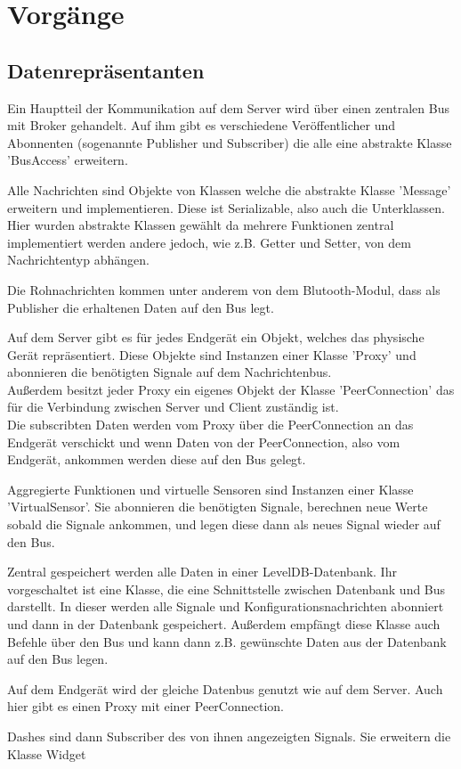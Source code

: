 \documentclass[entwurf.tex]{subfiles}
\begin{document}
\chapter{Vorgänge}
\section{Datenrepräsentanten}
Ein Hauptteil der Kommunikation auf dem Server wird über einen zentralen Bus mit Broker gehandelt. Auf ihm gibt es verschiedene Veröffentlicher und Abonnenten (sogenannte Publisher und Subscriber) die alle  eine abstrakte Klasse 'BusAccess' erweitern.

Alle Nachrichten sind Objekte von Klassen welche die abstrakte Klasse 'Message' erweitern und implementieren. Diese ist Serializable, also auch die Unterklassen. Hier wurden abstrakte Klassen gewählt da mehrere Funktionen zentral implementiert werden andere jedoch, wie z.B. Getter und Setter, von dem Nachrichtentyp abhängen.  

Die Rohnachrichten kommen unter anderem von dem Blutooth-Modul, dass als Publisher die erhaltenen Daten auf den Bus legt.

Auf dem Server gibt es für jedes Endgerät ein Objekt, welches das physische Gerät repräsentiert. Diese Objekte sind Instanzen einer Klasse 'Proxy' und abonnieren die benötigten Signale auf dem Nachrichtenbus. \\
Außerdem besitzt jeder Proxy ein eigenes Objekt der Klasse 'PeerConnection' das für die Verbindung zwischen Server und Client zuständig ist. \\
Die subscribten Daten werden vom Proxy über die PeerConnection an das Endgerät verschickt und wenn Daten von der PeerConnection, also vom Endgerät, ankommen werden diese auf den Bus gelegt.

Aggregierte Funktionen und virtuelle Sensoren sind Instanzen einer Klasse 'VirtualSensor'. Sie abonnieren die benötigten Signale, berechnen neue Werte sobald die Signale ankommen, und legen diese dann als neues Signal wieder auf den Bus. 

Zentral gespeichert werden alle Daten in einer LevelDB-Datenbank. Ihr vorgeschaltet ist eine Klasse, die eine Schnittstelle zwischen Datenbank und Bus darstellt. In dieser werden alle Signale und Konfigurationsnachrichten abonniert und dann in der Datenbank gespeichert. Außerdem empfängt diese Klasse auch Befehle über den Bus und kann dann z.B. gewünschte Daten aus der Datenbank auf den Bus legen.

Auf dem Endgerät wird der gleiche Datenbus genutzt wie auf dem Server. Auch hier gibt es einen Proxy mit einer PeerConnection.

Dashes sind dann Subscriber des von ihnen angezeigten Signals. Sie erweitern die Klasse Widget
\end{document}
